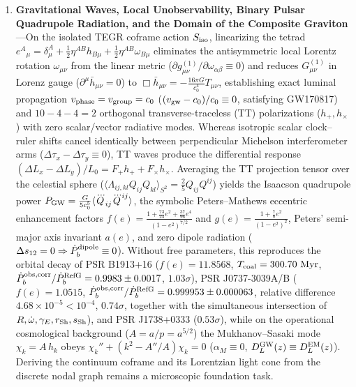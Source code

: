 \documentclass[11pt,a4paper]{article}
\begin{document}
\begin{enumerate}[label=\arabic*.]
\item \textbf{Gravitational Waves, Local Unobservability, Binary Pulsar Quadrupole Radiation, and the Domain of the Composite Graviton}---On the isolated TEGR coframe action $S_{\rm iso}$, linearizing the tetrad $e^A{}_\mu = \delta^A_\mu + \frac{1}{2}\eta^{AB}h_{B\mu} + \frac{1}{2}\eta^{AB}\omega_{B\mu}$ eliminates the antisymmetric local Lorentz rotation $\omega_{\mu\nu}$ from the linear metric ($\partial g^{(1)}_{\mu\nu}/\partial\omega_{\alpha\beta} \equiv 0$) and reduces $G^{(1)}_{\mu\nu}$ in Lorenz gauge ($\partial^\mu\bar{h}_{\mu\nu}=0$) to $\Box\bar{h}_{\mu\nu} = -\frac{16\pi G}{c_0^4}T_{\mu\nu}$, establishing exact luminal propagation $v_{\rm phase} = v_{\rm group} = c_0$ ($(v_{\rm gw}-c_0)/c_0 \equiv 0$, satisfying GW170817) and $10 - 4 - 4 = 2$ orthogonal transverse-traceless (TT) polarizations ($h_+, h_\times$) with zero scalar/vector radiative modes. Whereas isotropic scalar clock--ruler shifts cancel identically between perpendicular Michelson interferometer arms ($\Delta\tau_x - \Delta\tau_y \equiv 0$), TT waves produce the differential response $(\Delta L_x - \Delta L_y)/L_0 = F_+ h_+ + F_\times h_\times$. Averaging the TT projection tensor over the celestial sphere ($\langle\Lambda_{ij,kl}Q_{ij}Q_{kl}\rangle_{S^2} = \frac{2}{5}Q_{ij}Q^{ij}$) yields the Isaacson quadrupole power $P_{\rm GW} = \frac{G}{5c_0^5}\langle\dddot{Q}_{ij}\dddot{Q}^{ij}\rangle$, the symbolic Peters--Mathews eccentric enhancement factors $f(e) = \frac{1 + \frac{73}{24}e^2 + \frac{37}{96}e^4}{(1-e^2)^{7/2}}$ and $g(e) = \frac{1 + \frac{7}{8}e^2}{(1-e^2)^2}$, Peters' semi-major axis invariant $a(e)$, and zero dipole radiation ($\Delta s_{12} = 0 \Rightarrow \dot{P}_b^{\rm dipole} \equiv 0$). Without free parameters, this reproduces the orbital decay of PSR B1913+16 ($f(e) = 11.8568$, $T_{\rm coal} = 300.70\text{ Myr}$, $\dot{P}_b^{\rm obs,corr}/\dot{P}_b^{\rm RefG} = 0.9983 \pm 0.0017$, $1.03\sigma$), PSR J0737-3039A/B ($f(e) = 1.0515$, $\dot{P}_b^{\rm obs,corr}/\dot{P}_b^{\rm RefG} = 0.999953 \pm 0.000063$, relative difference $4.68\times 10^{-5} < 10^{-4}$, $0.74\sigma$, together with the simultaneous intersection of $R, \dot{\omega}, \gamma_E, r_{\rm Sh}, s_{\rm Sh}$), and PSR J1738+0333 ($0.53\sigma$), while on the operational cosmological background ($A = a/p = a^{5/2}$) the Mukhanov--Sasaki mode $\chi_k = A\,h_k$ obeys $\chi_k'' + (k^2 - A''/A)\chi_k = 0$ ($\alpha_M \equiv 0$, $D_L^{\rm GW}(z) \equiv D_L^{\rm EM}(z)$). Deriving the continuum coframe and its Lorentzian light cone from the discrete nodal graph remains a microscopic foundation task.


\end{enumerate}
\end{document}
